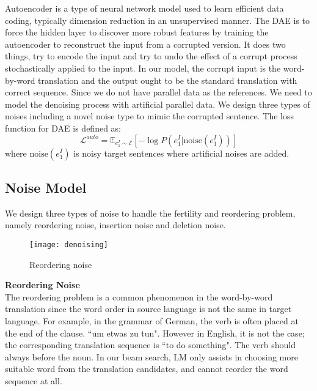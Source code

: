 	Autoencoder is a type of neural network model used to learn efficient data coding, typically dimension reduction in an unsupervised manner. The DAE is to force the hidden layer to discover more robust features by training the autoencoder to reconstruct the input from a corrupted version. It does two things, try to encode the input and try to undo the effect of a corrupt process stochastically applied to the input. In our model, the corrupt input is the word-by-word translation and the output ought to be the standard translation with correct sequence. Since we do not have parallel data as the references. We need to model the denoising process with artificial parallel data. We design three types of noises including a novel noise type to mimic the corrupted sentence. The loss function for DAE is defined as: 
	\[ \mathcal{L}^{auto} = \mathbb{E}_{e_1^I \sim \mathcal{E}}[-\log P(e_1^I| \text{noise}(e_1^I))] \]
	where $\text{noise}(e_1^I)$ is noisy target sentences where artificial noises are added.

	
\subsection{Noise Model}
We design three types of noise to handle the fertility and reordering problem, namely reordering noise, insertion noise and deletion noise. 


	\begin{figure}[h]
	\texttt{[image: denoising]}
	\caption{ Reordering noise}
	\centering
\end{figure}
	\textbf{Reordering Noise}\\

	The reordering problem is a common phenomenon in the word-by-word translation since the word order in source language is not the same in target language. 
	For example, in  the grammar of German, the verb is often placed at the end of the clause. 
	``um etwas zu tun". However in English, it is not the case; the corresponding translation sequence is ``to do something". The verb should always before the noun.
	In our beam search, LM only assists in choosing  more suitable word from the translation candidates, and cannot reorder the word sequence at all.
	
